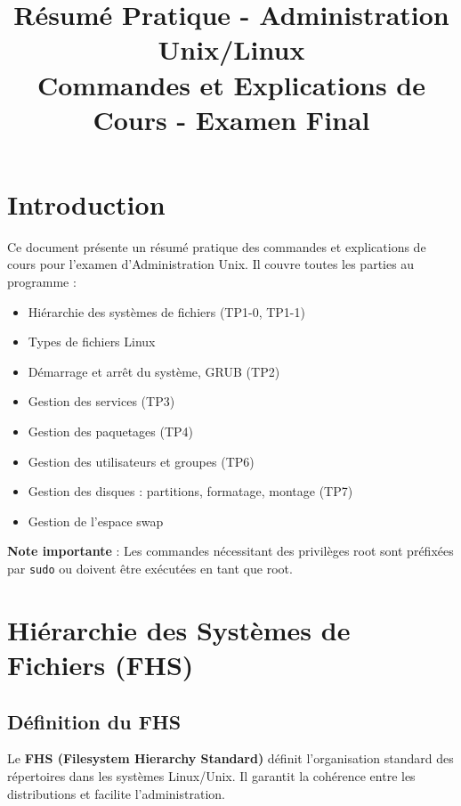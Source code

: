 \documentclass[12pt,a4paper]{article}
\title{\textbf{Résumé Pratique - Administration Unix/Linux}\\
\large Commandes et Explications de Cours - Examen Final}
\author{}
\date{}
\begin{document}
\maketitle
\thispagestyle{fancy}

\section*{Introduction}
Ce document présente un résumé pratique des commandes et explications de cours pour l'examen d'Administration Unix. Il couvre toutes les parties au programme :
\begin{itemize}
    \item Hiérarchie des systèmes de fichiers (TP1-0, TP1-1)
    \item Types de fichiers Linux
    \item Démarrage et arrêt du système, GRUB (TP2)
    \item Gestion des services (TP3)
    \item Gestion des paquetages (TP4)
    \item Gestion des utilisateurs et groupes (TP6)
    \item Gestion des disques : partitions, formatage, montage (TP7)
    \item Gestion de l'espace swap
\end{itemize}

\textbf{Note importante} : Les commandes nécessitant des privilèges root sont préfixées par \texttt{sudo} ou doivent être exécutées en tant que root.

\newpage
\tableofcontents
\newpage


\section{Hiérarchie des Systèmes de Fichiers (FHS)}

\subsection{Définition du FHS}

Le \textbf{FHS (Filesystem Hierarchy Standard)} définit l'organisation standard des répertoires dans les systèmes Linux/Unix. Il garantit la cohérence entre les distributions et facilite l'administration.
\end{document}
